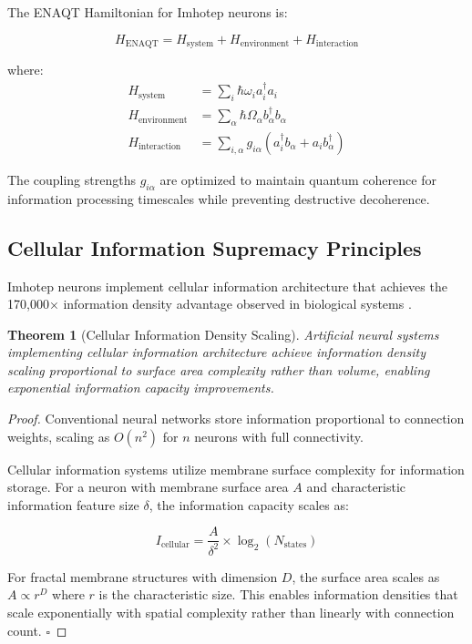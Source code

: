 \documentclass[12pt,a4paper]{article}
\newtheorem{theorem}{Theorem}[section]
\theoremstyle{remark}
\begin{document}
The ENAQT Hamiltonian for Imhotep neurons is:

\begin{equation}
H_{\text{ENAQT}} = H_{\text{system}} + H_{\text{environment}} + H_{\text{interaction}}
\end{equation}

where:
\begin{align}
H_{\text{system}} &= \sum_{i} \hbar \omega_i a_i^\dagger a_i \\
H_{\text{environment}} &= \sum_{\alpha} \hbar \Omega_\alpha b_\alpha^\dagger b_\alpha \\
H_{\text{interaction}} &= \sum_{i,\alpha} g_{i\alpha} (a_i^\dagger b_\alpha + a_i b_\alpha^\dagger)
\end{align}

The coupling strengths $g_{i\alpha}$ are optimized to maintain quantum coherence for information processing timescales while preventing destructive decoherence.

\subsection{Cellular Information Supremacy Principles}

Imhotep neurons implement cellular information architecture that achieves the 170,000× information density advantage observed in biological systems \cite{sachikonye2024intracellular}.

\begin{theorem}[Cellular Information Density Scaling]
Artificial neural systems implementing cellular information architecture achieve information density scaling proportional to surface area complexity rather than volume, enabling exponential information capacity improvements.
\end{theorem}

\begin{proof}
Conventional neural networks store information proportional to connection weights, scaling as $O(n^2)$ for $n$ neurons with full connectivity.

Cellular information systems utilize membrane surface complexity for information storage. For a neuron with membrane surface area $A$ and characteristic information feature size $\delta$, the information capacity scales as:

\begin{equation}
I_{\text{cellular}} = \frac{A}{\delta^2} \times \log_2(N_{\text{states}})
\end{equation}

For fractal membrane structures with dimension $D$, the surface area scales as $A \propto r^D$ where $r$ is the characteristic size. This enables information densities that scale exponentially with spatial complexity rather than linearly with connection count. $\square$
\end{proof}
\end{document}
